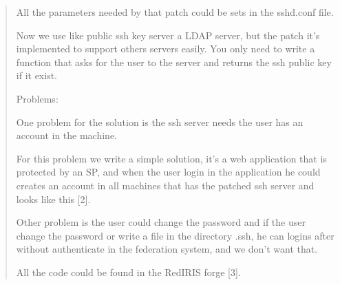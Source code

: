 \begin{quote}
    All the parameters needed by that patch could be sets in the
    sshd.conf file.

    Now we use like public ssh key server a LDAP server, but the patch
    it's implemented to support others servers easily. You only need
    to write a function that asks for the user to the server and
    returns the ssh public key if it exist.

Problems:
    
    One problem for the solution is the ssh server needs
    the user has an account in the machine.

    For this problem we write a simple solution, it's a web
    application that is protected by an SP, and when the user login in
    the application he could creates an account in all machines that
    has the patched ssh server and looks like this [2].

    Other problem is the user could change the password and if
    the user change the password or write a file in the directory
    .ssh, he can logins after without authenticate in the federation
    system, and we don't want that.

All the code could be found in the RedIRIS forge [3].


\end{quote}
